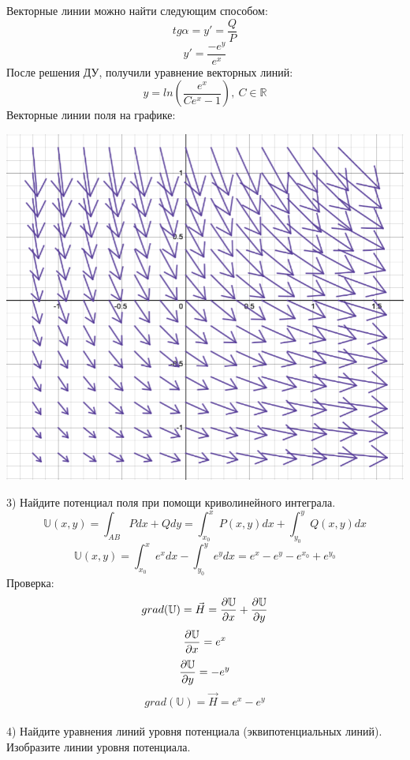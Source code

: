 \documentclass{article}
\begin{document}
Векторные линии можно найти следующим способом:
\begin{equation*}
    tg\alpha = y' = \frac{Q}{P}
\end{equation*}
\begin{equation*}
    y' = \frac{-e^y}{e^x}
\end{equation*}
После решения ДУ, получили уравнение векторных линий:
\begin{equation*}
    y = ln\left(\frac{e^x}{Ce^x-1}\right),\ C\in \mathbb{R}
\end{equation*}
Векторные линии поля на графике:
\begin{center}
    \includegraphics[width=.5\textwidth]{vecLin.png}
\end{center}
3) Найдите потенциал поля при помощи криволинейного интеграла.
\begin{equation*}
    \mathbb{U}(x, y) = \int_{AB}Pdx+Qdy = \int_{x_0}^{x}P(x, y)dx +\int_{y_0}^{y}Q(x, y)dx
\end{equation*}
\begin{equation*}
    \mathbb{U}(x, y) = \int_{x_0}^{x}e^xdx -\int_{y_0}^{y}e^ydx = e^x-e^y-e^{x_0}+e^{y_0}
\end{equation*}
Проверка:
\begin{equation*}
    grad(\mathbb{U}) = \vec{H} = \pdv{\mathbb{U}}{x} + \pdv{\mathbb{U}}{y}
\end{equation*}
\begin{equation*}
    \pdv{\mathbb{U}}{x} = e^x
\end{equation*}
\begin{equation*}
    \pdv{\mathbb{U}}{y} = -e^y
\end{equation*}
\begin{equation*}
    grad(\mathbb{U}) = \vec{H} = e^x -e^y
\end{equation*}
\\
4) Найдите уравнения линий уровня потенциала (эквипотенциальных линий). Изобразите
линии уровня потенциала.
\end{document}
